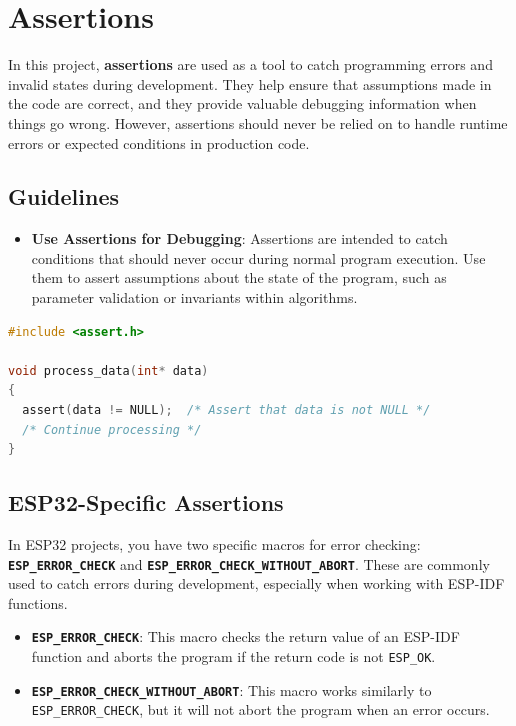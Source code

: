 \section{Assertions}
In this project, \textbf{assertions} are used as a tool to catch programming errors and invalid states during development. They help ensure that assumptions made in the code are correct, and they provide valuable debugging information when things go wrong. However, assertions should never be relied on to handle runtime errors or expected conditions in production code.

\subsection{Guidelines}
\begin{itemize}
    \item \textbf{Use Assertions for Debugging}: Assertions are intended to catch conditions that should never occur during normal program execution. Use them to assert assumptions about the state of the program, such as parameter validation or invariants within algorithms.
\end{itemize}
\begin{lstlisting}[language=C]
#include <assert.h>

void process_data(int* data)
{
  assert(data != NULL);  /* Assert that data is not NULL */
  /* Continue processing */
}
\end{lstlisting}

\subsection{ESP32-Specific Assertions}
In ESP32 projects, you have two specific macros for error checking: \textbf{\texttt{ESP\_ERROR\_CHECK}} and \textbf{\texttt{ESP\_ERROR\_CHECK\_WITHOUT\_ABORT}}. These are commonly used to catch errors during development, especially when working with ESP-IDF functions.

\begin{itemize}
    \item \textbf{\texttt{ESP\_ERROR\_CHECK}}: This macro checks the return value of an ESP-IDF function and aborts the program if the return code is not \texttt{ESP\_OK}.
    \item \textbf{\texttt{ESP\_ERROR\_CHECK\_WITHOUT\_ABORT}}: This macro works similarly to \texttt{ESP\_ERROR\_CHECK}, but it will not abort the program when an error occurs.
\end{itemize}
